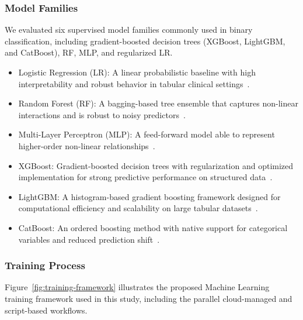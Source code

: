 \documentclass[diagnostics,article,accept,pdftex,moreauthors]{Definitions/mdpi}
\begin{document}
\subsubsection{Model Families}
\label{sec:model-families}

We evaluated six supervised model families commonly used in binary
classification, including gradient-boosted decision trees (XGBoost,
LightGBM, and CatBoost), \ac{RF}, \ac{MLP}, and regularized
\ac{LR}.

\begin{itemize}
\item {Logistic Regression (LR)}: A linear probabilistic
  baseline with high interpretability and robust behavior in
  tabular clinical settings~\cite{cox1958logistic}. %
\item {Random Forest (RF):} A bagging-based tree ensemble that
  captures non-linear interactions and is robust to noisy
  predictors~\cite{breiman2001randomforest}.%
\item {Multi-Layer Perceptron (MLP):} A feed-forward
  model able to represent higher-order non-linear
  relationships~\cite{rumelhart1986backprop}.%
\item {XGBoost:} Gradient-boosted decision trees with
  regularization and optimized implementation for strong predictive
  performance on structured data~\cite{chen2016xgboost}.%
\item {LightGBM:} A histogram-based gradient boosting framework
  designed for computational efficiency and scalability on large
  tabular datasets~\cite{ke2017lightgbm}.%
\item {CatBoost:} An ordered boosting method with native support
  for categorical variables and reduced prediction
  shift~\cite{prokhorenkova2018catboost}.%
\end{itemize}

\subsubsection{Training Process}
\label{sec:training-process}
Figure~\ref{fig:training-framework} illustrates the proposed
Machine Learning training framework used in this study, including the
parallel cloud-managed and script-based workflows.
\end{document}
